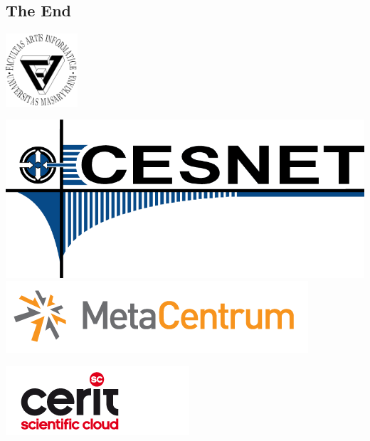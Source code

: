 \subsection{The End}

\begin{frame}
	\hspace{0.7cm}
		\includegraphics[width=0.2\textwidth]{filogo.pdf}
	\hspace{1cm}
	\begin{minipage}[b]{0.3\textwidth}
		\includegraphics[width=\textwidth]{cesnet-logo-800.png}\newline
		\includegraphics[width=\textwidth]{metalogo1.png}
	\end{minipage}
	\hspace{0.4cm}
	\begin{minipage}[b]{0.3\textwidth}
	\includegraphics[width=\textwidth]{cerit-sc-logo.png}
	\vspace{1cm}
\end{minipage}
\end{frame}



